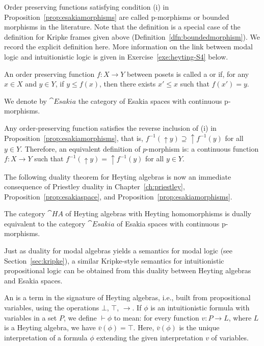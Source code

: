   
  Order preserving functions satisfying condition (i) in Proposition~\ref{prop:esakiamorphisms} are called p-morphisms or bounded morphisms in the literature.  Note that the definition is a special case of the definition for Kripke frames given above (Definition~\ref{dfn:boundedmorphism}). 
We record the explicit definition here. More information on the link between modal logic and intuitionistic logic is given in Exercise~\ref{exe:heyting-S4} below. 
 \begin{definition}
  An order preserving function $f \colon X \to Y$ between posets is called a  or  if, for any $x \in X$ and $y \in Y$, if $y \leq f(x)$, then there exists $x' \leq x$ such that $f(x') = y$.
  
  We denote by $\cat{Esakia}$ the category of Esakia spaces with continuous p-morphisms.
  \end{definition}
  Any order-preserving function satisfies the reverse inclusion of (i) in Proposition~\ref{prop:esakiamorphisms}, that is, $f^{-1}({\uparrow} y) \supseteq {\uparrow} f^{-1}(y)$ for all $y \in Y$. Therefore, an equivalent definition of $p$-morphism is: a continuous function $f \colon X \to Y$ such that $f^{-1}({\uparrow} y) = {\uparrow} f^{-1}(y)$ for all $y \in Y$. 

The following duality theorem for Heyting algebras is now an immediate consequence of Priestley duality in Chapter~\ref{ch:priestley}, Proposition~\ref{prop:esakiaspace}, and Proposition~\ref{prop:esakiamorphisms}.
\begin{theorem}
The category $\cat{HA}$ of Heyting algebras with Heyting homomorphisms is dually equivalent to the category $\cat{Esakia}$ of Esakia spaces with continuous p-morphisms.
\end{theorem}
Just as duality for modal algebras yields a semantics for modal logic (see Section~\ref{sec:kripke}), a similar Kripke-style semantics for intuitionistic propositional logic can be obtained from this duality between Heyting algebras and Esakia spaces.

An  is a term in the signature of Heyting algebras, i.e., built from propositional variables, using the operations $\bot$, $\top$, $\to$. If $\phi$ is an intuitionistic formula with variables in a set $P$, we define $\vdash \phi$ to mean: for every function $v \colon P \to L$, where $L$ is a Heyting algebra, we have $\overline{v}(\phi) = \top$. Here, $\overline{v}(\phi)$ is the unique interpretation of a formula $\phi$ extending the given interpretation $v$ of variables. 

